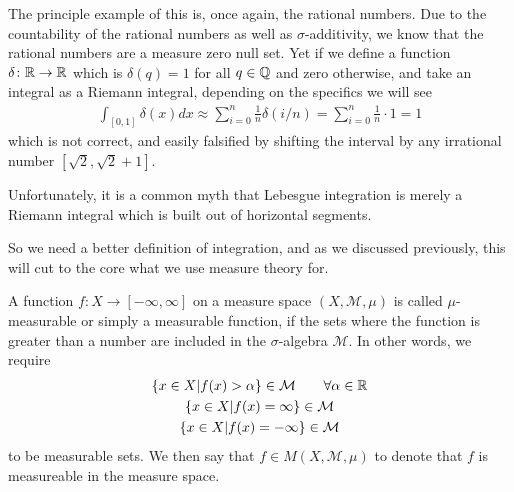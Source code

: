 \documentclass[11pt]{article}
\begin{document}
The principle example of this is, once again, the rational numbers. Due to the countability of the rational numbers as well as $\sigma$-additivity, we know that the rational numbers are a measure zero null set. Yet if we define a function $\delta \colon \mathbb{R} \to \mathbb{R}$ which is $\delta(q) = 1$ for all $q\in \mathbb{Q}$ and zero otherwise, and take an integral as a Riemann integral, depending on the specifics we will see \begin{gather*}
\int_{[0,1]} \delta(x) dx \approx \sum_{i=0}^n \frac{1}{n} \delta(i/n)  = \sum_{i=0}^n \frac{1}{n} \cdot 1 = 1
\end{gather*}
which is not correct, and easily falsified by shifting the interval by any irrational number $[\sqrt{2}, \sqrt{2} + 1]$.

Unfortunately, it is a common myth that Lebesgue integration is merely a Riemann integral which is built out of horizontal segments. 

So we need a better definition of integration, and as we discussed previously, this will cut to the core what we use measure theory for.

\begin{definition}
A function $f \colon X \to [-\infty,\infty]$ on a measure space $(X,\mathcal M, \mu)$ is called $\mu$-measurable or simply a measurable function, if the sets where the function is greater than a number are included in the $\sigma$-algebra $\mathcal M$. In other words, we require \begin{gather*}
\{x \in X | f(x) > \alpha \} \in \mathcal M \hspace{2em} \forall \alpha \in \mathbb{R} \\
\{x \in X | f(x) =\infty \} \in \mathcal M \\
\{x \in X | f(x) = -\infty \} \in \mathcal M
\end{gather*}
to be measurable sets. We then say that $f \in M(X,\mathcal M, \mu)$ to denote that $f$ is measureable in the measure space.
\end{definition}
\end{document}
